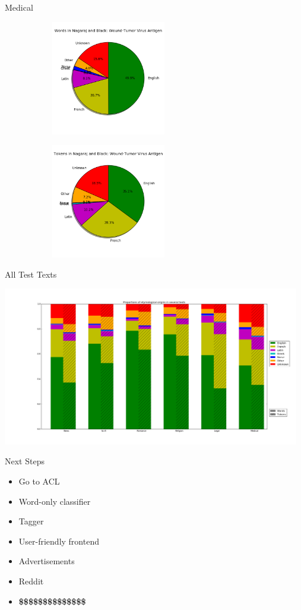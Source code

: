 \documentclass[10pt]{beamer}
\begin{document}
\begin{frame}[fragile]{Medical}

  \begin{figure}
  \centering
  \begin{subfigure}
  \centering
    \includegraphics[width=5cm]{medwords.png}
  \end{subfigure}
  \begin{subfigure}
  \centering
    \includegraphics[width=5cm]{medtokens.png}
  \end{subfigure}
  \end{figure}
\end{frame}

\begin{frame}[fragile]{All Test Texts}

  \centerline{\includegraphics[width=13cm]{stackedbarsreversed.png}}

\end{frame}


\begin{frame}[fragile]{Next Steps}

  \begin{itemize}[<+->]
    \item Go to ACL
    \item Word-only classifier
    \item Tagger
    \item User-friendly frontend
    \item Advertisements
    \item Reddit
    \item \textbf{\$\$\$\$\$\$\$\$\$\$\$\$\$\$}
  \end{itemize}



\end{frame}
\end{document}
